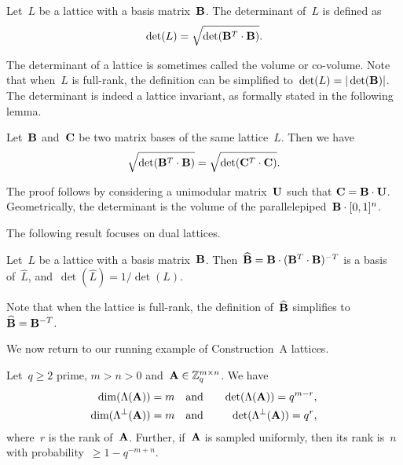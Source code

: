 \begin{definition}
\label{def:vol}
Let~$L$ be a lattice with a basis matrix~${\bf B}$. The determinant of~$L$ is defined as
\[
\det(L) = \sqrt{\det( {\bf B}^T \cdot {\bf B})}.
\]
\end{definition}

The determinant of a lattice is sometimes called the volume or co-volume. Note that when~$L$ is full-rank, the definition can 
be simplified to~$\det(L) = |\det ({\bf B})|$. The determinant is indeed a lattice invariant, as formally stated in the 
following lemma. 

\begin{lemma}
Let~${\bf B}$ and~${\bf C}$ be two matrix bases of the same lattice~$L$. Then we have
 \[
 \sqrt{\det( {\bf B}^T \cdot {\bf B})} =  \sqrt{\det( {\bf C}^T \cdot {\bf C})}.
\]
\end{lemma}

The proof follows by considering a unimodular matrix~${\bf U}$ such that ${\bf C} = {\bf B} \cdot {\bf U}$. 
Geometrically, %
the determinant is the volume of the parallelepiped~${\bf B} \cdot [0,1]^n$. 

The following result focuses on dual lattices. 

\begin{lemma}
\label{le:dual_det}
Let~$L$ be a lattice with a basis matrix~${\bf B}$. Then~$\widehat{{\bf B}} = {\bf B} \cdot ( {\bf B}^T \cdot {\bf B})^{-T}$ 
is a basis of~$\widehat{L}$, and~$\det(\widehat{L}) = 1/\det(L)$.  
\end{lemma}
 
Note that when the lattice is full-rank, the definition of~$\widehat{{\bf B}}$ simplifies to~$\widehat{{\bf B}} =  {\bf B}^{-T}$. 

We now return to our running example of Construction~A lattices. 

\begin{lemma}
\label{le:consA_dimdet}
Let~$q\geq 2$ prime, $m>n>0$ and~${\bf A} \in \mathbb{Z}_q^{m \times n}$. 
We have 
\begin{eqnarray*}
\dim (\Lambda({\bf A})) = m \ \ &\mbox{ and }& \ \ \det(\Lambda({\bf A})) = q^{m - r}, \\
\dim (\Lambda^{\perp}({\bf A})) = m \ \ &\mbox{ and }& \ \ \det(\Lambda^{\perp}({\bf A})) = q^{r},
\end{eqnarray*}
where~$r$ is the rank of~${\bf A}$. Further, if~${\bf A}$ is sampled uniformly, then its 
rank is~$n$ with probability~$\geq 1 - q^{-m+n}$. 
\end{lemma}

